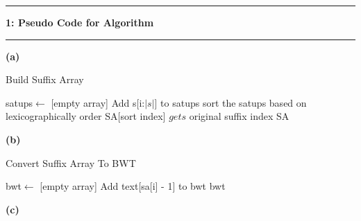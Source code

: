 \documentclass[11pt]{article}
\newcommand\question[2]{\vspace{.25in}\hrule\textbf{#1: #2}\vspace{.5em}\hrule\vspace{.10in}}
\renewcommand\part[1]{\vspace{.10in}\textbf{(#1)}}
\begin{document}
\raggedright
\newcommand\NAME{Nan Du}  %
\newcommand\ANDREWID{dunan}     %
\newcommand\HWNUM{3}              %


\question{1}{Pseudo Code for Algorithm} 

\part{a} 


\begin{algorithm}[H]
	\caption{Build Suffix Array}\label{suffixarray}
	\begin{algorithmic}[1]
		\State satups$ \gets $ [empty array] 
			\State Add s[i:$ |s| $] to satups
		\EndFor
		\State sort the satups based on lexicographically order
		\State SA[sort index] $ gets $ original suffix index
		\State\Return SA
		\EndFunction

	\end{algorithmic}
\end{algorithm}


\part{b}

\begin{algorithm}[H]
	\caption{Convert Suffix Array To BWT}\label{bwt}
	\begin{algorithmic}[1]
		\State bwt$ \gets $ [empty array] 
			\State Add text[sa[i] - 1] to bwt
		\EndFor
		\State\Return bwt
		\EndFunction

	\end{algorithmic}
\end{algorithm}

\part{c}
\end{document}
